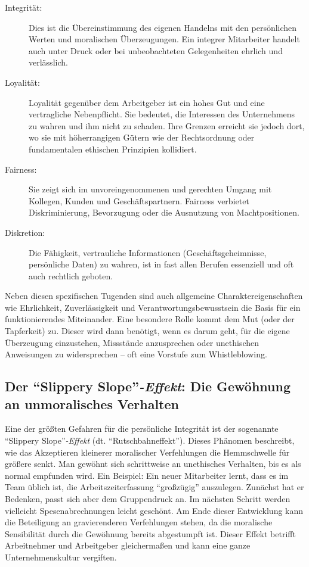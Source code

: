 \documentclass[
    12pt,               %
    a4paper,            %
    ngerman             %
]{scrartcl}
\begin{document}
\begin{description}
    \item[Integrität:] Dies ist die Übereinstimmung des eigenen Handelns mit den persönlichen Werten und moralischen Überzeugungen. Ein integrer Mitarbeiter handelt auch unter Druck oder bei unbeobachteten Gelegenheiten ehrlich und verlässlich.
    \item[Loyalität:] Loyalität gegenüber dem Arbeitgeber ist ein hohes Gut und eine vertragliche Nebenpflicht. Sie bedeutet, die Interessen des Unternehmens zu wahren und ihm nicht zu schaden. Ihre Grenzen erreicht sie jedoch dort, wo sie mit höherrangigen Gütern wie der Rechtsordnung oder fundamentalen ethischen Prinzipien kollidiert.
    \item[Fairness:] Sie zeigt sich im unvoreingenommenen und gerechten Umgang mit Kollegen, Kunden und Geschäftspartnern. Fairness verbietet Diskriminierung, Bevorzugung oder die Ausnutzung von Machtpositionen.
    \item[Diskretion:] Die Fähigkeit, vertrauliche Informationen (Geschäftsgeheimnisse, persönliche Daten) zu wahren, ist in fast allen Berufen essenziell und oft auch rechtlich geboten.
\end{description}

Neben diesen spezifischen Tugenden sind auch allgemeine Charaktereigenschaften wie Ehrlichkeit, Zuverlässigkeit und Verantwortungsbewusstsein die Basis für ein funktionierendes Miteinander. Eine besondere Rolle kommt dem Mut (oder der Tapferkeit) zu. Dieser wird dann benötigt, wenn es darum geht, für die eigene Überzeugung einzustehen, Missstände anzusprechen oder unethischen Anweisungen zu widersprechen – oft eine Vorstufe zum Whistleblowing.

\subsection{Der \enquote{Slippery Slope}\textit{-Effekt}: Die Gewöhnung an unmoralisches Verhalten}
Eine der größten Gefahren für die persönliche Integrität ist der sogenannte \enquote{Slippery Slope}\textit{-Effekt} (dt. \enquote{Rutschbahneffekt}). Dieses Phänomen beschreibt, wie das Akzeptieren kleinerer moralischer Verfehlungen die Hemmschwelle für größere senkt. Man gewöhnt sich schrittweise an unethisches Verhalten, bis es als normal empfunden wird. Ein Beispiel: Ein neuer Mitarbeiter lernt, dass es im Team üblich ist, die Arbeitszeiterfassung \enquote{großzügig} auszulegen. Zunächst hat er Bedenken, passt sich aber dem Gruppendruck an. Im nächsten Schritt werden vielleicht Spesenabrechnungen leicht geschönt. Am Ende dieser Entwicklung kann die Beteiligung an gravierenderen Verfehlungen stehen, da die moralische Sensibilität durch die Gewöhnung bereits abgestumpft ist. Dieser Effekt betrifft Arbeitnehmer und Arbeitgeber gleichermaßen und kann eine ganze Unternehmenskultur vergiften.
\end{document}
